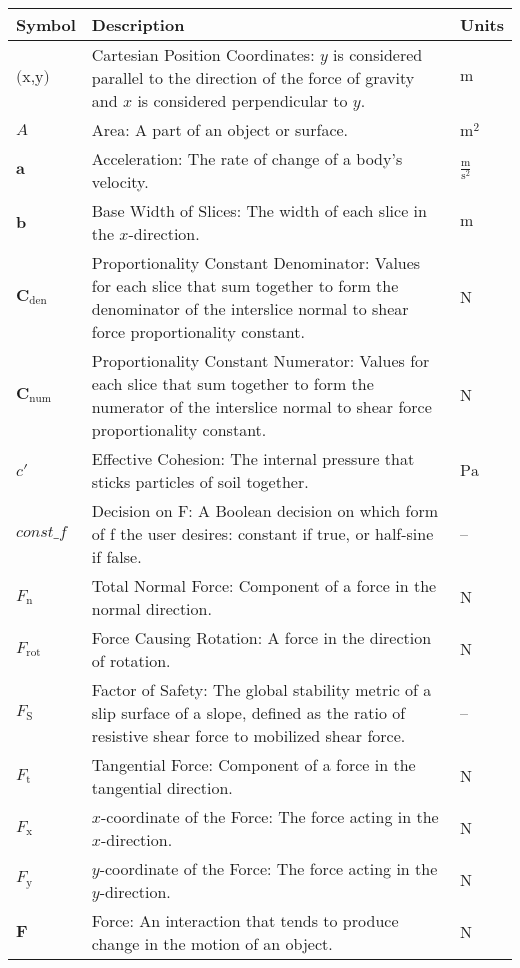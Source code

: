 \documentclass[12pt]{article}
\begin{document}
\begin{longtabu}{l X[l] l}
\toprule
\textbf{Symbol} & \textbf{Description} & \textbf{Units}
\\
\midrule
\endhead
$\text{(x,y)}$ & Cartesian Position Coordinates: $y$ is considered parallel to the direction of the force of gravity and $x$ is considered perpendicular to $y$. & ${\text{m}}$
\\
$A$ & Area: A part of an object or surface. & ${\text{m}^{2}}$
\\
$\symbf{a}$ & Acceleration: The rate of change of a body's velocity. & $\frac{\text{m}}{\text{s}^{2}}$
\\
$\symbf{b}$ & Base Width of Slices: The width of each slice in the $x$-direction. & ${\text{m}}$
\\
${\symbf{C}_{\text{den}}}$ & Proportionality Constant Denominator: Values for each slice that sum together to form the denominator of the interslice normal to shear force proportionality constant. & ${\text{N}}$
\\
${\symbf{C}_{\text{num}}}$ & Proportionality Constant Numerator: Values for each slice that sum together to form the numerator of the interslice normal to shear force proportionality constant. & ${\text{N}}$
\\
$c'$ & Effective Cohesion: The internal pressure that sticks particles of soil together. & ${\text{Pa}}$
\\
$\mathit{const\_f}$ & Decision on F: A Boolean decision on which form of f the user desires: constant if true, or half-sine if false. & --
\\
${F_{\text{n}}}$ & Total Normal Force: Component of a force in the normal direction. & ${\text{N}}$
\\
${F_{\text{rot}}}$ & Force Causing Rotation: A force in the direction of rotation. & ${\text{N}}$
\\
${F_{\text{S}}}$ & Factor of Safety: The global stability metric of a slip surface of a slope, defined as the ratio of resistive shear force to mobilized shear force. & --
\\
${F_{\text{t}}}$ & Tangential Force: Component of a force in the tangential direction. & ${\text{N}}$
\\
${F_{\text{x}}}$ & $x$-coordinate of the Force: The force acting in the $x$-direction. & ${\text{N}}$
\\
${F_{\text{y}}}$ & $y$-coordinate of the Force: The force acting in the $y$-direction. & ${\text{N}}$
\\
$\symbf{F}$ & Force: An interaction that tends to produce change in the motion of an object. & ${\text{N}}$

\end{longtabu}
\end{document}

